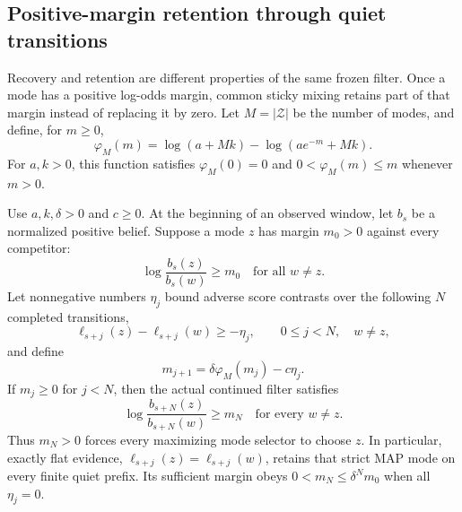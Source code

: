 \subsection{Positive-margin retention through quiet transitions}
\label{app:quiet_retention}

Recovery and retention are different properties of the same frozen filter.
Once a mode has a positive log-odds margin, common sticky mixing retains part of that margin instead of replacing it by zero.
Let $M=|\mathcal Z|$ be the number of modes, and define, for $m\ge0$,
\begin{equation}
 \varphi_M(m)=\log(a+Mk)-\log(ae^{-m}+Mk).
 \label{eq:sticky_positive_retention}
\end{equation}
For $a,k>0$, this function satisfies $\varphi_M(0)=0$ and
$0<\varphi_M(m)\le m$ whenever $m>0$.

\begin{theorem}
\label{thm:quiet_retention}
Use $a,k,\delta>0$ and $c\ge0$.
At the beginning of an observed window, let $b_s$ be a normalized positive belief.
Suppose a mode $z$ has margin $m_0>0$ against every competitor:
\begin{equation}
 \log\frac{b_s(z)}{b_s(w)}\ge m_0
 \quad\text{for all }w\ne z.
 \label{eq:retention_initial_margin}
\end{equation}
Let nonnegative numbers $\eta_j$ bound adverse score contrasts over the following $N$ completed transitions,
\begin{equation}
 \ell_{s+j}(z)-\ell_{s+j}(w)\ge-\eta_j,
 \qquad 0\le j<N,\quad w\ne z,
 \label{eq:retention_score_budget}
\end{equation}
and define
\begin{equation}
 m_{j+1}=\delta\varphi_M(m_j)-c\eta_j.
 \label{eq:positive_margin_recursion}
\end{equation}
If $m_j\ge0$ for $j<N$, then the actual continued filter satisfies
\begin{equation}
 \log\frac{b_{s+N}(z)}{b_{s+N}(w)}\ge m_N
 \quad\text{for every }w\ne z.
 \label{eq:retained_actual_margin}
\end{equation}
Thus $m_N>0$ forces every maximizing mode selector to choose $z$.
In particular, exactly flat evidence, $\ell_{s+j}(z)=\ell_{s+j}(w)$, retains that strict MAP mode on every finite quiet prefix.
Its sufficient margin obeys $0<m_N\le\delta^N m_0$ when all $\eta_j=0$.
\end{theorem}

